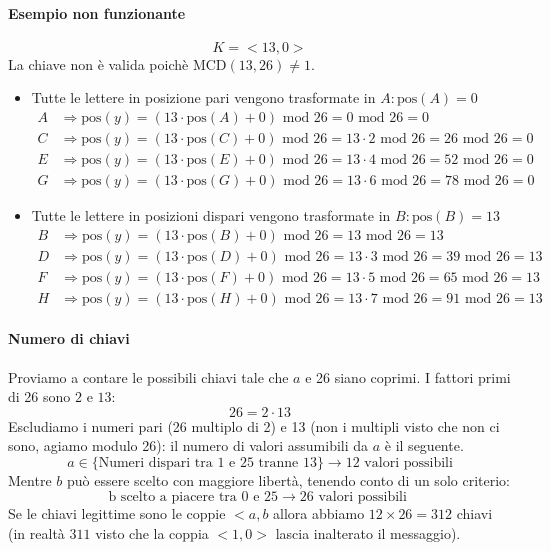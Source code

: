 \paragraph{Esempio non funzionante} $$K = <13, 0>$$
La chiave non è valida poichè $\text{MCD}(13,26) \neq 1$.
\begin{itemize}
	\item Tutte le lettere in posizione pari vengono trasformate in $A: \text{pos}(A)=0$
	\begin{align*}
		A &\Longrightarrow \text{pos}(y) = (13 \cdot \text{pos}(A)+0) \text{ mod }26 = 0 \text{ mod } 26 =0\\
		C &\Longrightarrow \text{pos}(y) = (13 \cdot \text{pos}(C)+0) \text{ mod }26 = 13 \cdot 2 \text{ mod } 26 = 26 \text{ mod } 26 =0\\
		E &\Longrightarrow \text{pos}(y) = (13 \cdot \text{pos}(E)+0) \text{ mod }26 = 13 \cdot 4 \text{ mod } 26 = 52 \text{ mod } 26 =0\\
		G &\Longrightarrow \text{pos}(y) = (13 \cdot \text{pos}(G)+0) \text{ mod }26 = 13 \cdot 6 \text{ mod } 26 = 78 \text{ mod } 26 =0
	\end{align*}
	\item Tutte le lettere in posizioni dispari vengono trasformate in $B: \text{pos}(B)=13$
	\begin{align*}
		B &\Longrightarrow \text{pos}(y) = (13 \cdot \text{pos}(B)+0) \text{ mod }26 = 13 \text{ mod } 26 =13\\
		D &\Longrightarrow \text{pos}(y) = (13 \cdot \text{pos}(D)+0) \text{ mod }26 = 13 \cdot 3 \text{ mod } 26 = 39 \text{ mod } 26 =13\\
		F &\Longrightarrow \text{pos}(y) = (13 \cdot \text{pos}(F)+0) \text{ mod }26 = 13 \cdot 5 \text{ mod } 26 = 65 \text{ mod } 26 =13\\
		H &\Longrightarrow \text{pos}(y) = (13 \cdot \text{pos}(H)+0) \text{ mod }26 = 13 \cdot 7 \text{ mod } 26 = 91 \text{ mod } 26 =13
	\end{align*}
\end{itemize}
\paragraph{Numero di chiavi} Proviamo a contare le possibili chiavi tale che $a$ e 26 siano coprimi. I fattori primi di 26 sono $2$ e $13$:
$$ 26 = 2 \cdot 13 $$
Escludiamo i numeri pari (26 multiplo di 2) e 13 (non i multipli visto che non ci sono, agiamo modulo 26): il numero di valori assumibili da $a$ è il seguente.
$$ a \in \{ \text{Numeri dispari tra 1 e 25 tranne 13} \} \xrightarrow{} 12 \text{ valori possibili} $$
Mentre $b$ può essere scelto con maggiore libertà, tenendo conto di un solo criterio:
$$ \text{b scelto a piacere tra 0 e 25} \xrightarrow{} 26 \text{ valori possibili } $$
Se le chiavi legittime sono le coppie $<a,b$ allora abbiamo $12 \times 26 = 312$ chiavi (in realtà $311$ visto che la coppia $<1,0>$ lascia inalterato il messaggio). 
